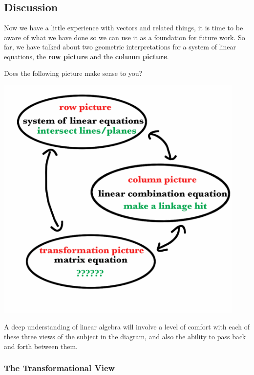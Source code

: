 \documentclass[10pt,]{book}
\newcommand{\terminology}[1]{\textbf{#1}}
\theoremstyle{plain}
\theoremstyle{definition}
\numberwithin{equation}{section}
\renewenvironment{figure}%
{\begin{mbxfigure}\setcounter{mbxfigure}{\value{theorem}}\stepcounter{theorem}}%
{\end{mbxfigure}}
\begin{document}
\subsection[Discussion]{Discussion}\label{subsection-21}

      Now we have a little experience with vectors and related things, it is
      time to be aware of what we have done so we can use it as a foundation for
      future work. So far, we have talked about two geometric interpretations
      for a system of linear equations, the \terminology{row picture} and the
      \terminology{column picture}.
\par

      Does the following picture make sense to you?
\begin{figure}
\centering
\includegraphics[width=350pt,]{images/ThreePics.png}\caption{The three geometric models of linear algebra\label{figure-1}}
\end{figure}
\par

      A deep understanding of linear algebra will involve a level of comfort with
      each of these three views of the subject in the diagram, and also the ability
      to pass back and forth between them.
\typeout{************************************************}
\typeout{************************************************}
\subsubsection[The Transformational View]{The Transformational View}\label{subsubsection-10}
\end{document}
